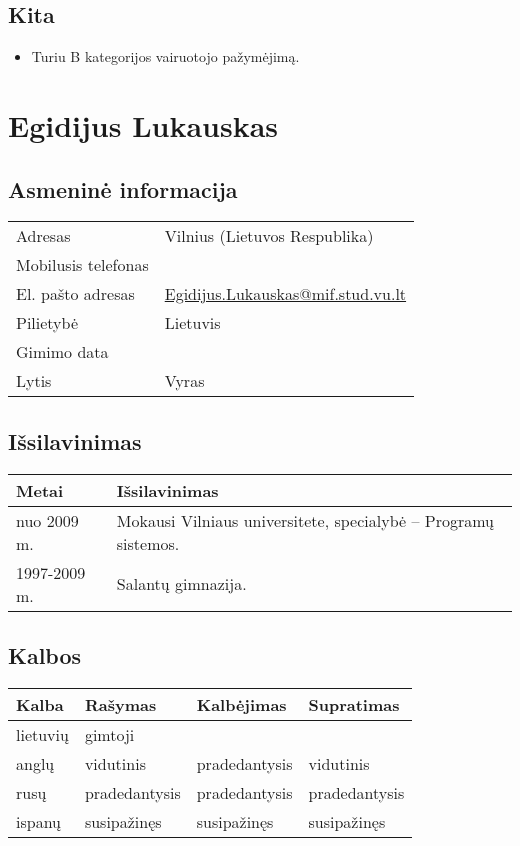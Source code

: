 \subsection{Kita}

\begin{itemize}
  \item Turiu B kategorijos vairuotojo pažymėjimą.
\end{itemize}

\section{Egidijus Lukauskas}

\subsection{Asmeninė informacija}

\begin{tabular}[]{p{3cm} | p{8cm}}
  Adresas & Vilnius (Lietuvos Respublika) \\
  Mobilusis telefonas & \\
  El. pašto adresas & \url{Egidijus.Lukauskas@mif.stud.vu.lt} \\
  Pilietybė & Lietuvis \\
  Gimimo data & \\
  Lytis & Vyras \\
\end{tabular}

\subsection{Išsilavinimas}

\begin{tabular}[]{p{3cm} | p{8cm}}
  Metai & Išsilavinimas \\
  \hline
  nuo 2009 m. & Mokausi Vilniaus universitete, 
    specialybė – Programų sistemos. \\
  1997-2009 m. & Salantų gimnazija. \\
\end{tabular}

\subsection{Kalbos}

\begin{tabular}[]{p{3cm} | p{2.5cm} p{2.5cm} p{2.0cm}}
  Kalba & Rašymas & Kalbėjimas & Supratimas \\
  \hline
  lietuvių & gimtoji && \\
  anglų & vidutinis & pradedantysis & vidutinis \\
  rusų & pradedantysis & pradedantysis & pradedantysis \\
  ispanų & susipažinęs & susipažinęs & susipažinęs \\
\end{tabular}

